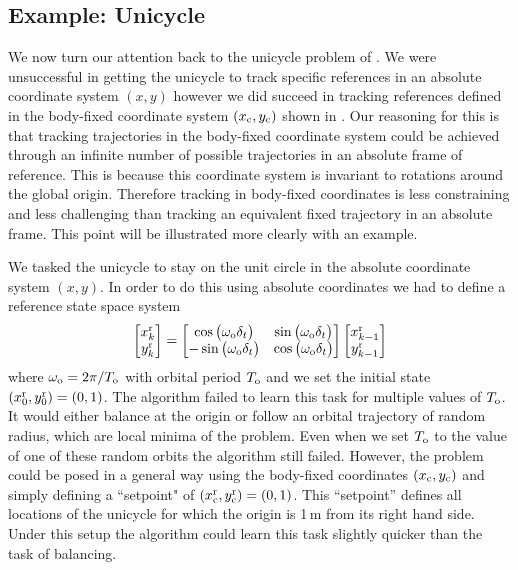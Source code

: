\subsection{Example: Unicycle}
We now turn our attention back to the unicycle problem of . We were unsuccessful in getting the unicycle to track specific references in an absolute coordinate system $(x,y)$ however we did succeed in tracking references defined in the body-fixed coordinate system $(x_{\text{c}},y_{\text{c}})$ shown in . Our reasoning for this is that tracking trajectories in the body-fixed coordinate system could be achieved through an infinite number of possible trajectories in an absolute frame of reference. This is because this coordinate system is invariant to rotations around the global origin. Therefore tracking in body-fixed coordinates is less constraining and less challenging than tracking an equivalent fixed trajectory in an absolute frame. This point will be illustrated more clearly with an example.

We tasked the unicycle to stay on the unit circle in the absolute coordinate system $(x,y)$. In order to do this using absolute coordinates we had to define a reference state space system
\begin{equation*}
\begin{bmatrix} x^{\text{r}}_k \\ y^{\text{r}}_k \end{bmatrix} = \begin{bmatrix}  \cos\big(\omega_{\text{o}} \delta_t\big) & \sin\big(\omega_{\text{o}} \delta_t\big) \\ -\sin\big(\omega_{\text{o}} \delta_t\big) & \cos\big(\omega_{\text{o}} \delta_t\big)  \end{bmatrix}
\begin{bmatrix} x^{\text{r}}_{k-1} \\ y^{\text{r}}_{k-1} \end{bmatrix}
\end{equation*}
where $\omega_{\text{o}} = 2\pi/T_{\text{o}}$ with orbital period $T_{\text{o}}$ and we set the initial state $(x^{\text{r}}_0, y^{\text{r}}_0)=(0,1)$. The algorithm failed to learn this task for multiple values of $T_{\text{o}}$. It would either balance at the origin or follow an orbital trajectory of random radius, which are local minima of the problem. Even when we set $T_{\text{o}}$ to the value of one of these random orbits the algorithm still failed. However, the problem could be posed in a general way using the body-fixed coordinates $(x_{\text{c}},y_{\text{c}})$ and simply defining a ``setpoint" of $(x^{\text{r}}_{\text{c}},y^{\text{r}}_{\text{c}}) = (0,1)$. This ``setpoint'' defines all locations of the unicycle for which the origin is 1$\,$m from its right hand side. Under this setup the algorithm could learn this task slightly quicker than the task of balancing.






